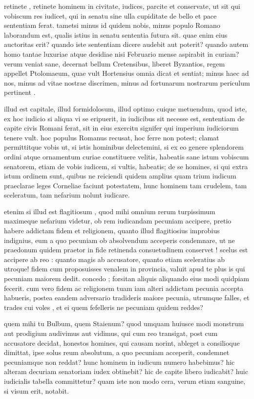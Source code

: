  retinete , retinete hominem in civitate, iudices, parcite et conservate, ut sit qui vobiscum res iudicet, qui in senatu sine ulla cupiditate de bello et pace sententiam ferat. tametsi minus id quidem nobis, minus populo Romano laborandum est, qualis istius in senatu sententia futura sit. quae enim eius auctoritas erit? quando iste sententiam dicere audebit aut poterit? quando autem homo tantae luxuriae atque desidiae nisi Februario mense aspirabit in curiam? verum veniat sane, decernat bellum Cretensibus, liberet Byzantios, regem appellet Ptolomaeum, quae vult Hortensius omnia dicat et sentiat; minus haec ad nos, minus ad vitae nostrae discrimen, minus ad fortunarum nostrarum periculum pertinent .

 illud est capitale, illud formidolosum, illud optimo cuique metuendum, quod iste, ex hoc iudicio si aliqua vi se eripuerit, in iudicibus sit necesse est, sententiam de capite civis Romani ferat, sit in eius exercitu signifer qui imperium iudiciorum tenere vult. hoc populus Romanus recusat, hoc ferre non potest; clamat permittitque vobis ut, si istis hominibus delectemini, si ex eo genere splendorem ordini atque ornamentum curiae constituere velitis, habeatis sane istum vobiscum senatorem, etiam de vobis iudicem, si vultis, habeatis; de se homines, si qui extra istum ordinem sunt, quibus ne reiciendi quidem amplius quam trium iudicum praeclarae leges Corneliae faciunt potestatem, hunc hominem tam crudelem, tam sceleratum, tam nefarium nolunt iudicare.

 etenim si illud est flagitiosum , quod mihi omnium rerum turpissimum maximeque nefarium videtur, ob rem iudicandam pecuniam accipere, pretio habere addictam fidem et religionem, quanto illud flagitiosius improbius indignius, eum a quo pecuniam ob absolvendum acceperis condemnare, ut ne praedonum quidem praetor in fide retinenda consuetudinem conservet ! scelus est accipere ab reo : quanto magis ab accusatore, quanto etiam sceleratius ab utroque! fidem cum proposuisses venalem in provincia, valuit apud te plus is qui pecuniam maiorem dedit. concedo ; forsitan aliquis aliquando eius modi quidpiam fecerit. cum vero fidem ac religionem tuam iam alteri addictam pecunia accepta habueris, postea eandem adversario tradideris maiore pecunia, utrumque falles, et trades cui voles , et ei quem fefelleris ne pecuniam quidem reddes?

 quem mihi tu Bulbum, quem Staienum? quod umquam huiusce modi monstrum aut prodigium audivimus aut vidimus, qui cum reo transigat, post cum accusatore decidat, honestos homines, qui causam norint, ableget a consilioque dimittat, ipse solus reum absolutum, a quo pecuniam acceperit, condemnet pecuniamque non reddat? hunc hominem in iudicum numero habebimus? hic alteram decuriam senatoriam iudex obtinebit? hic de capite libero iudicabit? huic iudicialis tabella committetur? quam iste non modo cera, verum etiam sanguine, si visum erit, notabit.

